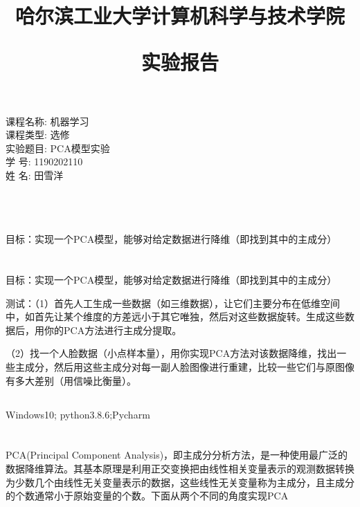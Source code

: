 \documentclass[lang=cn,a4paper,cite=authoryear]{elegantpaper}
\title{\zihao{1}哈尔滨工业大学计算机科学与技术学院 \par 实验报告}
\date{}
\begin{document}
\maketitle
\thispagestyle{empty}
\begin{center}
   	{ 课程名称:  机器学习}\\[.5cm]
    { 课程类型:   选修}\\[.5cm]
    { 实验题目:  PCA模型实验}\\[.5cm]
	{ 学 号:  1190202110}\\[.5cm]
	{ 姓 名: 田雪洋}\\[.5cm]
    { \date{\zhtoday}}\\[.50cm]
\end{center}


\newpage
{}
\section*{}
目标：实现一个PCA模型，能够对给定数据进行降维（即找到其中的主成分）

\section*{}
\subsection*{}
目标：实现一个PCA模型，能够对给定数据进行降维（即找到其中的主成分）
\par 测试：（1）首先人工生成一些数据（如三维数据），让它们主要分布在低维空间中，如首先让某个维度的方差远小于其它唯独，然后对这些数据旋转。生成这些数据后，用你的PCA方法进行主成分提取。
\par （2）找一个人脸数据（小点样本量），用你实现PCA方法对该数据降维，找出一些主成分，然后用这些主成分对每一副人脸图像进行重建，比较一些它们与原图像有多大差别（用信噪比衡量）。


\subsection*{}
Windows10; python3.8.6;Pycharm 
\section*{}
PCA(Principal Component Analysis)，即主成分分析方法，是一种使用最广泛的数据降维算法。其基本原理是利用正交变换把由线性相关变量表示的观测数据转换为少数几个由线性无关变量表示的数据，这些线性无关变量称为主成分，且主成分的个数通常小于原始变量的个数。下面从两个不同的角度实现PCA
\end{document}
